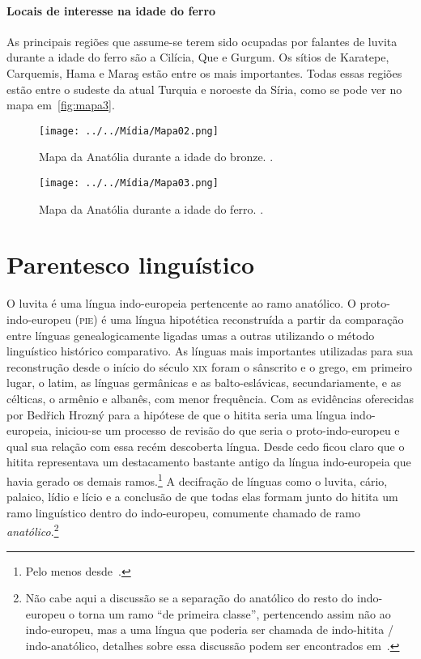 \paragraph{Locais de interesse na idade do ferro}
As principais regiões que assume-se terem sido ocupadas por falantes de luvita
durante a idade do ferro são a Cilícia, Que e Gurgum.
Os sítios de Karatepe, Carquemis, Hama e Maraş estão entre os mais importantes.
Todas essas regiões estão entre o sudeste da atual Turquia e noroeste da Síria,
como se pode ver no mapa em~\autoref{fig:mapa3}.

\vfill
\clearpage

\begin{figure}[ht!]
	\begin{center}
		\texttt{[image: ../../Mídia/Mapa02.png]}
	\end{center}
	\caption{Mapa da Anatólia durante a idade do bronze.
		\citet[37]{Melchert2003}.}\label{fig:mapa2}
	\begin{center}
		\texttt{[image: ../../Mídia/Mapa03.png]}
	\end{center}
	\caption{Mapa da Anatólia durante a idade do ferro.
		\citet[94]{Melchert2003}.}\label{fig:mapa3}
\end{figure}

\clearpage

\section{Parentesco linguístico}

O luvita é uma língua indo-europeia pertencente ao ramo anatólico.
O proto-indo-europeu (\textsc{pie}) é uma língua hipotética reconstruída a
partir da comparação entre línguas genealogicamente ligadas umas a outras
utilizando o método linguístico histórico comparativo.
As línguas mais importantes utilizadas para sua reconstrução desde o início do
século \textsc{xix} foram o sânscrito e o grego, em primeiro lugar, o latim, as
línguas germânicas e as balto-eslávicas, secundariamente, e as célticas,
o armênio e albanês, com menor frequência.
Com as evidências oferecidas por Bedřich Hrozný para a hipótese de que o
hitita seria uma língua indo-europeia, iniciou-se um processo de revisão do que
seria o proto-indo-europeu e qual sua relação com essa recém descoberta língua.
Desde cedo ficou claro que o hitita representava um destacamento bastante antigo
da língua indo-europeia que havia gerado os demais ramos.\footnote{Pelo menos
	desde~\citet{Sturtevant1933}.}
A decifração de línguas como o luvita, cário, palaico, lídio e lício e a
conclusão de que todas elas formam junto do hitita um ramo linguístico dentro do
indo-europeu, comumente chamado de ramo \emph{anatólico}.\footnote{Não cabe aqui
	a discussão se a separação do anatólico do resto do indo-europeu o torna um
	ramo ``de primeira classe'', pertencendo assim não ao indo-europeu, mas a uma
	língua que poderia ser chamada de indo-hitita \slash{} indo-anatólico,
	detalhes sobre essa discussão podem ser encontrados em~\citet{Ringue2017}.}


